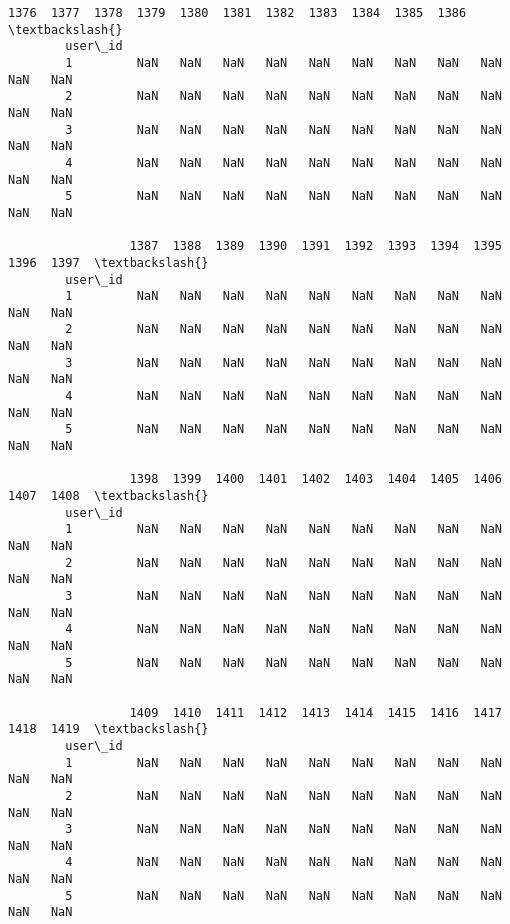 \documentclass[11pt]{article}
\begin{document}
\begin{Verbatim}[commandchars=\\\{\}]
                 1376  1377  1378  1379  1380  1381  1382  1383  1384  1385  1386  \textbackslash{}
        user\_id                                                                     
        1         NaN   NaN   NaN   NaN   NaN   NaN   NaN   NaN   NaN   NaN   NaN   
        2         NaN   NaN   NaN   NaN   NaN   NaN   NaN   NaN   NaN   NaN   NaN   
        3         NaN   NaN   NaN   NaN   NaN   NaN   NaN   NaN   NaN   NaN   NaN   
        4         NaN   NaN   NaN   NaN   NaN   NaN   NaN   NaN   NaN   NaN   NaN   
        5         NaN   NaN   NaN   NaN   NaN   NaN   NaN   NaN   NaN   NaN   NaN   
        
                 1387  1388  1389  1390  1391  1392  1393  1394  1395  1396  1397  \textbackslash{}
        user\_id                                                                     
        1         NaN   NaN   NaN   NaN   NaN   NaN   NaN   NaN   NaN   NaN   NaN   
        2         NaN   NaN   NaN   NaN   NaN   NaN   NaN   NaN   NaN   NaN   NaN   
        3         NaN   NaN   NaN   NaN   NaN   NaN   NaN   NaN   NaN   NaN   NaN   
        4         NaN   NaN   NaN   NaN   NaN   NaN   NaN   NaN   NaN   NaN   NaN   
        5         NaN   NaN   NaN   NaN   NaN   NaN   NaN   NaN   NaN   NaN   NaN   
        
                 1398  1399  1400  1401  1402  1403  1404  1405  1406  1407  1408  \textbackslash{}
        user\_id                                                                     
        1         NaN   NaN   NaN   NaN   NaN   NaN   NaN   NaN   NaN   NaN   NaN   
        2         NaN   NaN   NaN   NaN   NaN   NaN   NaN   NaN   NaN   NaN   NaN   
        3         NaN   NaN   NaN   NaN   NaN   NaN   NaN   NaN   NaN   NaN   NaN   
        4         NaN   NaN   NaN   NaN   NaN   NaN   NaN   NaN   NaN   NaN   NaN   
        5         NaN   NaN   NaN   NaN   NaN   NaN   NaN   NaN   NaN   NaN   NaN   
        
                 1409  1410  1411  1412  1413  1414  1415  1416  1417  1418  1419  \textbackslash{}
        user\_id                                                                     
        1         NaN   NaN   NaN   NaN   NaN   NaN   NaN   NaN   NaN   NaN   NaN   
        2         NaN   NaN   NaN   NaN   NaN   NaN   NaN   NaN   NaN   NaN   NaN   
        3         NaN   NaN   NaN   NaN   NaN   NaN   NaN   NaN   NaN   NaN   NaN   
        4         NaN   NaN   NaN   NaN   NaN   NaN   NaN   NaN   NaN   NaN   NaN   
        5         NaN   NaN   NaN   NaN   NaN   NaN   NaN   NaN   NaN   NaN   NaN   
        

\end{Verbatim}
\end{document}
